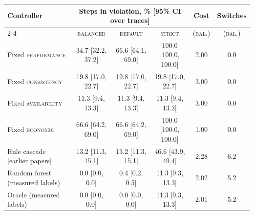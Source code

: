 \begin{tabular}{lccccc}
\toprule
Controller & \multicolumn{3}{c}{Steps in violation, \% [95\% CI over traces]} & Cost & Switches \\
\cmidrule(lr){2-4}
 & \textsc{balanced} & \textsc{default} & \textsc{strict} & (\textsc{bal.}) & (\textsc{bal.}) \\
\midrule
Fixed \textsc{performance} & 34.7 [32.2, 37.2] & 66.6 [64.1, 69.0] & 100.0 [100.0, 100.0] & 2.00 & 0.0 \\
Fixed \textsc{consistency} & 19.8 [17.0, 22.7] & 19.8 [17.0, 22.7] & 19.8 [17.0, 22.7] & 3.00 & 0.0 \\
Fixed \textsc{availability} & 11.3 [9.4, 13.3] & 11.3 [9.4, 13.3] & 11.3 [9.4, 13.3] & 3.00 & 0.0 \\
Fixed \textsc{economic} & 66.6 [64.2, 69.0] & 66.6 [64.2, 69.0] & 100.0 [100.0, 100.0] & 1.00 & 0.0 \\
\midrule
Rule cascade [earlier papers] & 13.2 [11.3, 15.1] & 13.2 [11.3, 15.1] & 46.6 [43.9, 49.4] & 2.28 & 6.2 \\
Random forest (measured labels) & 0.0 [0.0, 0.0] & 0.4 [0.2, 0.5] & 11.3 [9.3, 13.3] & 2.02 & 5.2 \\
Oracle (measured labels) & 0.0 [0.0, 0.0] & 0.0 [0.0, 0.0] & 11.3 [9.3, 13.3] & 2.01 & 5.2 \\
\bottomrule
\end{tabular}
